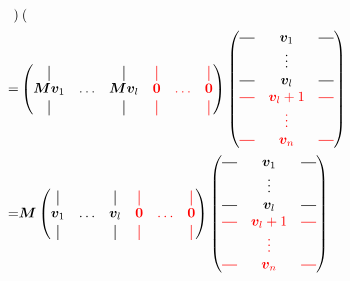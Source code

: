 \begin{align}
\begin{pmatrix}
        \end{pmatrix} \\
        =&
        \begin{pmatrix}
        \vertbar       &        & \vertbar       & \red{\vertbar} & \red{        } & \red{\vertbar} \\
        \bm{M}\bm{v}_1 & \hdots & \bm{M}\bm{v}_l & \red{\bm{0}  } & \red{ \hdots } & \red{\bm{0}}   \\
        \vertbar       &        & \vertbar       & \red{\vertbar} & \red{        } & \red{\vertbar}
        \end{pmatrix}
        \begin{pmatrix}
            \horzbar & \bm{v}_1   & \horzbar \\
                     & \vdots     &          \\
            \horzbar & \bm{v}_l   & \horzbar \\
            \red{\horzbar} & \red{\bm{v}_l+1} & \red{\horzbar} \\
                           & \red{\vdots    } &                \\
            \red{\horzbar} & \red{\bm{v}_n  } & \red{\horzbar} \\
        \end{pmatrix}\\
        =& \bm{M}\begin{pmatrix}
        \vertbar       &        & \vertbar       & \red{\vertbar} & \red{        } & \red{\vertbar} \\
        \bm{v}_1 & \hdots & \bm{v}_l & \red{\bm{0}  } & \red{ \hdots } & \red{\bm{0}}   \\
        \vertbar       &        & \vertbar       & \red{\vertbar} & \red{        } & \red{\vertbar}
        \end{pmatrix}
        \begin{pmatrix}
            \horzbar & \bm{v}_1   & \horzbar \\
                     & \vdots     &          \\
            \horzbar & \bm{v}_l   & \horzbar \\
            \red{\horzbar} & \red{\bm{v}_l+1} & \red{\horzbar} \\
                           & \red{\vdots    } &                \\
            \red{\horzbar} & \red{\bm{v}_n  } & \red{\horzbar} \\
        \end{pmatrix} \\

\end{align}
